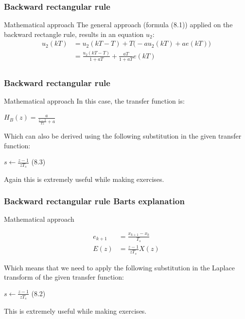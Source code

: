 \begin{frame}
	\frametitle{Backward rectangular rule}	
	\begin{block}{Mathematical approach}
		The general approach (formula (8.1)) applied on the backward rectangle rule, results in an equation $u_2$:
		\begin{align*}
		u_2(kT)& =u_2(kT - T) + T\big(-au_2(kT) + ae(kT) \big)\\
		&=\frac{u_2(kT - T)}{1 + aT} + \frac{aT}{1 + aT}e(kT)\\
		\end{align*}
	\end{block}
\end{frame}

\begin{frame}
	\frametitle{Backward rectangular rule}
	\begin{block}{Mathematical approach}
		In this case, the transfer function is:
		\begin{center}
			$H_B(z) = \frac{a}{\frac{z-1}{Tz}+a}$
		\end{center}
		Which can also be derived using the following substitution in the given transfer function:
		\begin{center}
			$s \gets \frac{z-1}{zT_s}$ (8.3)
		\end{center}
		Again this is extremely useful while making exercises.
	\end{block}
\end{frame}

\begin{frame}
	\frametitle{Backward rectangular rule Barts explanation}
	\begin{block}{Mathematical approach}
		\begin{center}
			\begin{align*}
			e_{k+1} &= \frac{x_{k+1} - x_{k}}{T_s}\\
			E(z) &= \frac{z -1}{zT_s} X(z)
			\end{align*}
		\end{center}
		Which means that we need to apply the following substitution in the Laplace transform of the given transfer function:
		\begin{center}
			$s \gets \frac{z-1}{zT_s}$ (8.2)
		\end{center}
		This is extremely useful while making exercises.
	\end{block}
\end{frame}

